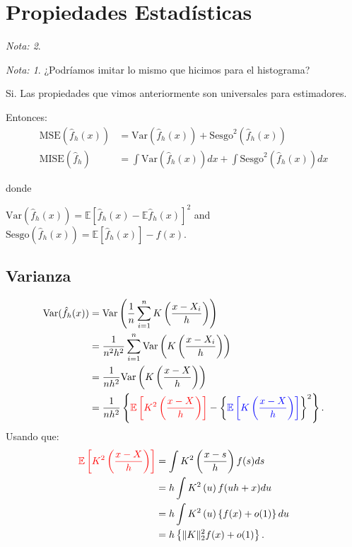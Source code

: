 \documentclass[
  12pt,
]{book}
\theoremstyle{definition}
\theoremstyle{definition}
\theoremstyle{definition}
\theoremstyle{remark}
\newtheorem*{remark}{Nota: }
\begin{document}
\hypertarget{propiedades-estaduxedsticas-1}{%
\section{Propiedades Estadísticas}\label{propiedades-estaduxedsticas-1}}

\begin{remark}
\begin{remark}

{}¿Podríamos imitar lo mismo que hicimos para el histograma?

\end{remark}
\end{remark}

Si. Las propiedades que vimos anteriormente son universales para estimadores.

Entonces:
\begin{align*}
\mathrm{MSE}(\hat{f}_{h}(x)) & =\mathrm{Var}(\hat{f}_{h}(x))+\mathrm{Sesgo}^{2} (\hat{f}_{h}(x))            \\
\mathrm{MISE}(\hat{f}_{h})   & =\int\mathrm{Var}(\hat{f}_{h}(x))dx+\int\mathrm{Sesgo}^{2}(\hat{f}_{h}(x))dx
\end{align*}

donde

\(\mathrm{Var}\left(\hat{f}_{h}(x)\right)=\mathbb{E}\left[\hat{f}_{h}(x)-\mathbb{E}\hat{f}_{h}(x)\right]^{2}\) and \(\mathrm{Sesgo}\left(\hat{f}_{h}(x)\right)=\mathbb{E}\left[\hat{f}_{h}(x)\right]-f(x)\).

\hypertarget{varianza-1}{%
\subsection{Varianza}\label{varianza-1}}

\begin{align*}
\mathrm{Var}(\hat{f}_{h}(x))
& =\mathrm{Var}\left(\frac{1}{n}\sum_{i=1}^{n}K\left(\frac{x-X_{i}}{h}\right)\right)          \\
& =\frac{1}{n^{2}h^{2}}\sum_{i=1}^{n}\mathrm{Var}\left(K\left(\frac{x-X_{i}}{h}\right)\right) \\
& =\frac{1}{nh^{2}}\mathrm{Var}\left(K\left(\frac{x-X}{h}\right)\right)                       \\
& =\frac{1}{nh^{2}}\left\{
\textcolor{red}{\mathbb{E}\left[K^{2}\left(\frac{x-X}{h}\right)\right]}
-\left\{
\textcolor{blue}{\mathbb{E}\left[K\left(\frac{x-X}{h}\right)\right]}
\right\}^{2}
\right\}.
\end{align*}
Usando que:
\begin{align*}
\textcolor{red}{\mathbb{E}\left[K^{2}\left(\frac{x-X}{h}\right)\right]}
& =\int K^{2}\left(\frac{x-s}{h}\right)f(s)ds            \\
& =h\int K^{2}\left(u\right)f(uh+x)du                    \\
& =h\int K^{2}\left(u\right)\left\{ f(x)+o(1)\right\} du \\
& =h\left\{ \Vert K\Vert_{2}^{2}f(x)+o(1)\right\} .
\end{align*}
\end{document}
